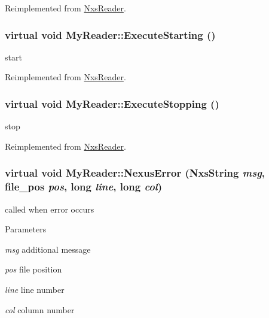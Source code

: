 Reimplemented from \hyperlink{classNxsReader}{NxsReader}.\hypertarget{classMyReader_a93ece63ab4306cf45f030b07395bc66e}{
\subsubsection[{ExecuteStarting}]{\setlength{\rightskip}{0pt plus 5cm}virtual void MyReader::ExecuteStarting ()}}
\label{classMyReader_a93ece63ab4306cf45f030b07395bc66e}
start 

Reimplemented from \hyperlink{classNxsReader}{NxsReader}.\hypertarget{classMyReader_aba1935daa8cec049934eb84822ddda4e}{
\subsubsection[{ExecuteStopping}]{\setlength{\rightskip}{0pt plus 5cm}virtual void MyReader::ExecuteStopping ()}}
\label{classMyReader_aba1935daa8cec049934eb84822ddda4e}
stop 

Reimplemented from \hyperlink{classNxsReader}{NxsReader}.\hypertarget{classMyReader_ad9cf686cdeb2e191cb5179094f723ef0}{
\subsubsection[{NexusError}]{\setlength{\rightskip}{0pt plus 5cm}virtual void MyReader::NexusError ({\bf NxsString} {\em msg}, \/  file\_\-pos {\em pos}, \/  long {\em line}, \/  long {\em col})}}
\label{classMyReader_ad9cf686cdeb2e191cb5179094f723ef0}
called when error occurs 
\begin{DoxyParams}{Parameters}
\item[{\em msg}]additional message \item[{\em pos}]file position \item[{\em line}]line number \item[{\em col}]column number \end{DoxyParams}


